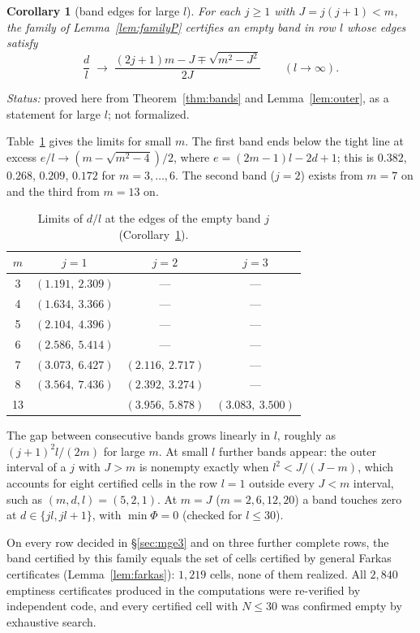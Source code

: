 \documentclass[11pt]{amsart}
\theoremstyle{plain}
\newtheorem{corollary}[theorem]{Corollary}
\theoremstyle{definition}
\theoremstyle{remark}
\newcommand{\status}[1]{\par\smallskip
  {\small\raggedright\noindent\textit{Status:} #1\par}\smallskip}
\begin{document}
\begin{corollary}[band edges for large $l$]\label{cor:edges}
For each $j \ge 1$ with $J = j(j+1) < m$, the family of Lemma~\ref{lem:familyP}
certifies an empty band in row $l$ whose edges satisfy
\[
  \frac{d}{l} \;\longrightarrow\; \frac{(2j+1)m - J \mp \sqrt{m^2-J^2}}{2J}
  \qquad (l \to \infty).
\]
\end{corollary}
\status{proved here from Theorem~\ref{thm:bands} and Lemma~\ref{lem:outer}, as a
statement for large $l$; not formalized.}

Table~\ref{tab:edges} gives the limits for small $m$. The first band ends below the
tight line at excess $e/l \to (m - \sqrt{m^2-4})/2$, where $e = (2m-1)l - 2d + 1$; this
is $0.382$, $0.268$, $0.209$, $0.172$ for $m = 3,\dots,6$. The second band ($j = 2$)
exists from $m = 7$ on and the third from $m = 13$ on.

\begin{table}[ht]
\centering\small
\caption{Limits of $d/l$ at the edges of the empty band $j$ (Corollary~\ref{cor:edges}).}
\label{tab:edges}
\begin{tabular}{@{}cccc@{}}
\toprule
$m$ & $j = 1$ & $j = 2$ & $j = 3$ \\
\midrule
3 & $(1.191,\ 2.309)$ & --- & --- \\
4 & $(1.634,\ 3.366)$ & --- & --- \\
5 & $(2.104,\ 4.396)$ & --- & --- \\
6 & $(2.586,\ 5.414)$ & --- & --- \\
7 & $(3.073,\ 6.427)$ & $(2.116,\ 2.717)$ & --- \\
8 & $(3.564,\ 7.436)$ & $(2.392,\ 3.274)$ & --- \\
13 & & $(3.956,\ 5.878)$ & $(3.083,\ 3.500)$ \\
\bottomrule
\end{tabular}
\end{table}

The gap between consecutive bands grows linearly in $l$, roughly as
$(j+1)^2 l/(2m)$ for large $m$. At small $l$ further bands appear: the outer interval of
a $j$ with $J > m$ is nonempty exactly when $l^2 < J/(J-m)$, which accounts for eight
certified cells in the row $l = 1$ outside every $J < m$ interval, such as
$(m,d,l) = (5,2,1)$. At $m = J$ ($m = 2, 6, 12, 20$) a band touches zero at
$d \in \{jl, jl+1\}$, with $\min\Phi = 0$ (checked for $l \le 30$).

On every row decided in \S\ref{sec:mge3} and on three further complete rows, the band
certified by this family equals the set of cells certified by general Farkas
certificates (Lemma~\ref{lem:farkas}): $1{,}219$ cells, none of them realized. All $2{,}840$ emptiness certificates produced in the
computations were re-verified by independent code, and every certified cell with
$N \le 30$ was confirmed empty by exhaustive search.
\end{document}
